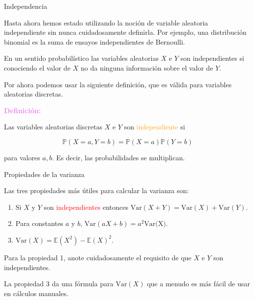 \documentclass[10pt]{beamer}
\begin{document}
\begin{frame}{Independencia}
	
\small{Hasta ahora hemos estado utilizando la noci\'on de variable aleatoria independiente sin nunca cuidadosamente definirla. Por ejemplo, una distribuci\'on binomial es la suma de ensayos independientes de Bernoulli. 
	
En un  sentido probabil\'istico  las variables aleatorias $X$ e $Y$ son independientes si conociendo el valor de $X$ no da ninguna informaci\'on sobre el valor de $Y$.
	
Por ahora podemos usar la siguiente definici\'on, que  es v\'alida para variables aleatorias discretas.
	
\textcolor{violet}{\textbf{Definici\'on:}}
	
Las variables aleatorias  discretas $X$ e $Y$ son \textcolor{orange}{independiente} si

\[
\mathbb{P}(X =a, Y = b) = \mathbb{P}(X =a)\mathbb{P}(Y = b)
\]


para valores $a, b$. Es decir, las probabilidades se multiplican.	
}
\end{frame}

\begin{frame}{Propiedades de la varianza}
	
\small{ Las tres propiedades m\'as \'utiles para calcular la varianza son:

\begin{enumerate}
	\item Si $X$ y $Y$ son \textcolor{red}{independientes} entonces $\text{Var}(X +Y) = \text{Var}(X) + \text{Var}(Y)$.
	\item Para constantes $a$ y $b$, $\text{Var}(aX + b) = a^2\text{Var(X)}.$
	\item $\text{Var}(X) = \mathbb{E}(X^2) - \mathbb{E}(X)^2$.
\end{enumerate}

Para la propiedad 1, anote cuidadosamente el requisito de que $X$ e $Y$ son independientes. 

La propiedad 3 da una f\'ormula para $\text{Var}(X)$ que a menudo es m\'as f\'acil de usar en c\'alculos manuales.
}

\end{frame}
\end{document}
